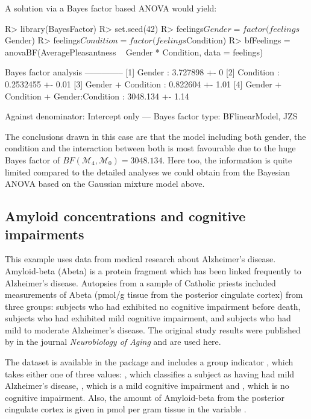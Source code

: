 A solution via a Bayes factor based ANOVA would yield:
\begin{example}
R> library(BayesFactor)
R> set.seed(42)
R> feelings$Gender = factor(feelings$Gender)
R> feelings$Condition = factor(feelings$Condition) 
R> bfFeelings = anovaBF(AveragePleasantness ~ Gender * Condition, data = feelings)

Bayes factor analysis
--------------
[1] Gender                                : 3.727898   +- 0%
[2] Condition                             : 0.2532455  +- 0.01%
[3] Gender + Condition                    : 0.822604   +- 1.01%
[4] Gender + Condition + Gender:Condition : 3048.134   +- 1.14%

Against denominator:
  Intercept only 
---
Bayes factor type: BFlinearModel, JZS	
\end{example}

The conclusions drawn in this case are that the model including both gender, the condition and the interaction between both is most favourable due to the huge Bayes factor of $BF(\mathcal{M}_4,\mathcal{M}_0)=3048.134$. Here too, the information is quite limited compared to the detailed analyses we could obtain from the Bayesian ANOVA based on the Gaussian mixture model above.


\subsection{Amyloid concentrations and cognitive impairments}
This example uses data from medical research about Alzheimer's disease. Amyloid-beta (Abeta) is a protein fragment which has been linked frequently to Alzheimer's disease. Autopsies from a sample of Catholic priests included measurements of Abeta (pmol/g tissue from the posterior cingulate cortex) from three groups: subjects who had exhibited no cognitive impairment before death, subjects who had exhibited mild cognitive impairment, and subjects who had mild to moderate Alzheimer's disease. The original study results were published by \cite{Pivtoraiko2015} in the journal \textit{Neurobiology of Aging} and are used here.

The  dataset is available in the  package \citep{Stat2DataRPackage} and includes a group indicator , which takes either one of three values: , which classifies a subject as having had mild Alzheimer's disease, , which is a mild cognitive impairment and , which is no cognitive impairment. Also, the amount of Amyloid-beta from the posterior cingulate cortex is given in pmol per gram tissue in the variable .

